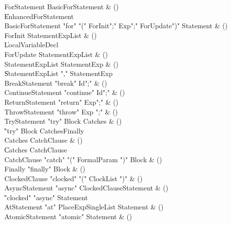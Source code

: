 \begin{bbgrammar}
 ForStatement  \label{prod:ForStatement}  \: BasicForStatement & ()\\
    \| EnhancedForStatement\\
 BasicForStatement  \label{prod:BasicForStatement}  \: \xcd"for" \xcd"(" ForInit\opt \xcd";" Exp\opt \xcd";" ForUpdate\opt \xcd")" Statement & ()\\
 ForInit  \label{prod:ForInit}  \: StatementExpList & ()\\
    \| LocalVariableDecl\\
 ForUpdate  \label{prod:ForUpdate}  \: StatementExpList & ()\\
 StatementExpList  \label{prod:StatementExpList}  \: StatementExp & ()\\
    \| StatementExpList \xcd"," StatementExp\\
 BreakStatement  \label{prod:BreakStatement}  \: \xcd"break" Id\opt \xcd";" & ()\\
 ContinueStatement  \label{prod:ContinueStatement}  \: \xcd"continue" Id\opt \xcd";" & ()\\
 ReturnStatement  \label{prod:ReturnStatement}  \: \xcd"return" Exp\opt \xcd";" & ()\\
 ThrowStatement  \label{prod:ThrowStatement}  \: \xcd"throw" Exp \xcd";" & ()\\
 TryStatement  \label{prod:TryStatement}  \: \xcd"try" Block Catches & ()\\
    \| \xcd"try" Block Catches\opt Finally\\
 Catches  \label{prod:Catches}  \: CatchClause & ()\\
    \| Catches CatchClause\\
 CatchClause  \label{prod:CatchClause}  \: \xcd"catch" \xcd"(" FormalParam \xcd")" Block & ()\\
 Finally  \label{prod:Finally}  \: \xcd"finally" Block & ()\\
 ClockedClause  \label{prod:ClockedClause}  \: \xcd"clocked" \xcd"(" ClockList \xcd")" & ()\\
 AsyncStatement  \label{prod:AsyncStatement}  \: \xcd"async" ClockedClause\opt Statement & ()\\
    \| \xcd"clocked" \xcd"async" Statement\\
 AtStatement  \label{prod:AtStatement}  \: \xcd"at" PlaceExpSingleList Statement & ()\\
 AtomicStatement  \label{prod:AtomicStatement}  \: \xcd"atomic" Statement & ()\\
\end{bbgrammar}

